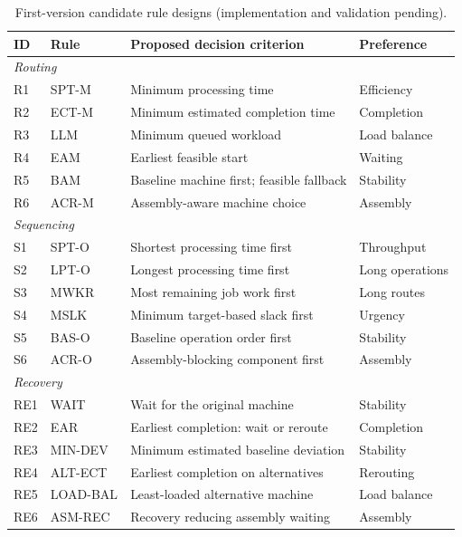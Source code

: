 \begin{table}[t]
\centering
\caption{First-version candidate rule designs (implementation and validation pending).}
\label{tab:proposed_rule_design}
\footnotesize
\setlength{\tabcolsep}{5pt}
\begin{tabular*}{\linewidth}{@{\extracolsep{\fill}}llp{}l@{}}
\toprule
ID & Rule & Proposed decision criterion & Preference \\
\midrule
\multicolumn{4}{l}{\textit{Routing}} \\
R1 & SPT-M & Minimum processing time & Efficiency \\
R2 & ECT-M & Minimum estimated completion time & Completion \\
R3 & LLM & Minimum queued workload & Load balance \\
R4 & EAM & Earliest feasible start & Waiting \\
R5 & BAM & Baseline machine first; feasible fallback & Stability \\
R6 & ACR-M & Assembly-aware machine choice & Assembly \\
\midrule
\multicolumn{4}{l}{\textit{Sequencing}} \\
S1 & SPT-O & Shortest processing time first & Throughput \\
S2 & LPT-O & Longest processing time first & Long operations \\
S3 & MWKR & Most remaining job work first & Long routes \\
S4 & MSLK & Minimum target-based slack first & Urgency \\
S5 & BAS-O & Baseline operation order first & Stability \\
S6 & ACR-O & Assembly-blocking component first & Assembly \\
\midrule
\multicolumn{4}{l}{\textit{Recovery}} \\
RE1 & WAIT & Wait for the original machine & Stability \\
RE2 & EAR & Earliest completion: wait or reroute & Completion \\
RE3 & MIN-DEV & Minimum estimated baseline deviation & Stability \\
RE4 & ALT-ECT & Earliest completion on alternatives & Rerouting \\
RE5 & LOAD-BAL & Least-loaded alternative machine & Load balance \\
RE6 & ASM-REC & Recovery reducing assembly waiting & Assembly \\
\bottomrule
\end{tabular*}
\end{table}

